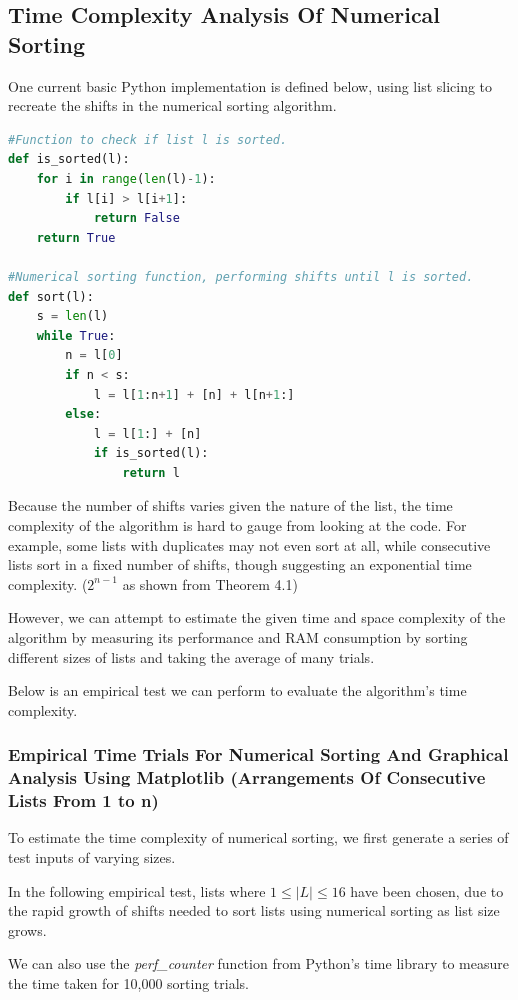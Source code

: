 \documentclass[12pt]{article}
\begin{document}
\subsection{Time Complexity Analysis Of Numerical Sorting}

One current basic Python implementation is defined below, using list slicing to recreate the shifts in the numerical sorting algorithm.

\begin{lstlisting}[language=Python]
#Function to check if list l is sorted.
def is_sorted(l):
    for i in range(len(l)-1):
        if l[i] > l[i+1]:
            return False
    return True

#Numerical sorting function, performing shifts until l is sorted.
def sort(l):
    s = len(l)
    while True:
        n = l[0]
        if n < s:
            l = l[1:n+1] + [n] + l[n+1:]
        else:
            l = l[1:] + [n]
            if is_sorted(l):
                return l
\end{lstlisting}

Because the number of shifts varies given the nature of the list, the time complexity of the algorithm is hard to gauge from looking at the code. For example, some lists with duplicates may not even sort at all, while consecutive lists sort in a fixed number of shifts, though suggesting an exponential time complexity. ($2^{n-1}$ as shown from Theorem 4.1)

However, we can attempt to estimate the given time and space complexity of the algorithm by measuring its performance and RAM consumption by sorting different sizes of lists and taking the average of many trials.

Below is an empirical test we can perform to evaluate the algorithm's time complexity.

\subsubsection{Empirical Time Trials For Numerical Sorting And Graphical Analysis Using Matplotlib (Arrangements Of Consecutive Lists From 1 to n)}

To estimate the time complexity of numerical sorting, we first generate a series of test inputs of varying sizes.

In the following empirical test, lists where $1 \leq |L| \leq 16$ have been chosen, due to the rapid growth of shifts needed to sort lists using numerical sorting as list size grows.

We can also use the \emph{perf\_counter} function from Python's time library to measure the time taken for 10,000 sorting trials.
\end{document}
